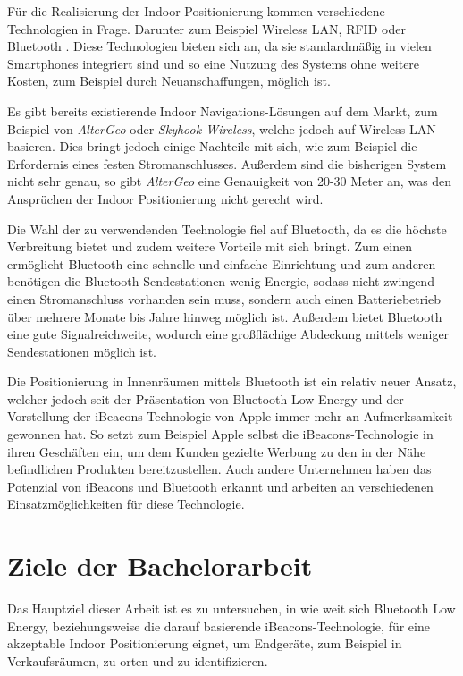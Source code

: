 Für die Realisierung der Indoor Positionierung kommen verschiedene Technologien in Frage. Darunter zum Beispiel Wireless LAN, RFID oder Bluetooth \cite{positioningOverview}.
Diese Technologien bieten sich an, da sie standardmäßig in vielen Smartphones integriert sind und so eine Nutzung des Systems ohne weitere Kosten, zum Beispiel durch Neuanschaffungen, möglich ist.

Es gibt bereits existierende Indoor Navigations-Lösungen auf dem Markt, zum Beispiel von \emph{AlterGeo} oder \emph{Skyhook Wireless}, welche jedoch auf Wireless LAN basieren. Dies bringt jedoch einige Nachteile mit sich, wie zum Beispiel die Erfordernis eines festen Stromanschlusses. Außerdem sind die bisherigen System nicht sehr genau, so gibt \emph{AlterGeo} eine Genauigkeit von 20-30 Meter an, was den Ansprüchen der Indoor Positionierung nicht gerecht wird.

Die Wahl der zu verwendenden Technologie fiel auf Bluetooth, da es die höchste Verbreitung bietet und zudem weitere Vorteile mit sich bringt. Zum einen ermöglicht Bluetooth eine schnelle und einfache Einrichtung und zum anderen benötigen die Bluetooth-Sendestationen wenig Energie, sodass nicht zwingend einen Stromanschluss vorhanden sein muss, sondern auch einen Batteriebetrieb über mehrere Monate bis Jahre hinweg möglich ist.
Außerdem bietet Bluetooth eine gute Signalreichweite, wodurch eine großflächige Abdeckung mittels weniger Sendestationen möglich ist.

Die Positionierung in Innenräumen mittels Bluetooth ist ein relativ neuer Ansatz, welcher jedoch seit der Präsentation von Bluetooth Low Energy und der Vorstellung der iBeacons-Technologie von Apple immer mehr an Aufmerksamkeit gewonnen hat. So setzt zum Beispiel Apple selbst die iBeacons-Technologie in ihren Geschäften ein, um dem Kunden gezielte Werbung zu den in der Nähe befindlichen Produkten bereitzustellen. Auch andere Unternehmen haben das Potenzial von iBeacons und Bluetooth erkannt und arbeiten an verschiedenen Einsatzmöglichkeiten für diese Technologie.

\section{Ziele der Bachelorarbeit}
\label{sec:introduction:goal}

Das Hauptziel dieser Arbeit ist es zu untersuchen, in wie weit sich Bluetooth Low Energy, beziehungsweise die darauf basierende iBeacons-Technologie, für eine akzeptable Indoor Positionierung eignet, um Endgeräte, zum Beispiel in Verkaufsräumen, zu orten und zu identifizieren.

